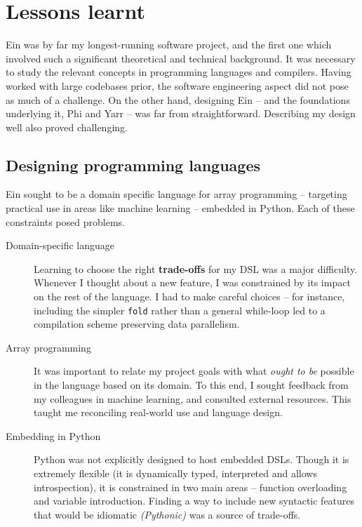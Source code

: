 \needspace{2em}
\section{Lessons learnt}

Ein was by far my longest-running software project, and the first one which involved such a significant theoretical and technical background. 
It was necessary to study the relevant concepts in programming languages and compilers.
Having worked with large codebases prior, the software engineering aspect did not pose as much of a challenge. 
On the other hand, designing Ein -- and the foundations underlying it, Phi and Yarr -- was far from straightforward. 
Describing my design well also proved challenging. 

\subsection{Designing programming languages}

Ein sought to be a domain specific language for array programming -- targeting practical use in areas like machine learning -- embedded in Python. Each of these constraints posed problems.

\begin{description}
    \item[Domain-specific language] 
    Learning to choose the right \textbf{trade-offs} for my DSL was a major difficulty. 
    Whenever I thought about a new feature, I was constrained by its impact on the rest of the language. 
    I had to make careful choices -- for instance, including the simpler \texttt{fold} rather than a general while-loop led to a compilation scheme preserving data parallelism.
    \item[Array programming] 
    It was important to relate my project goals with what \textit{ought to be} possible in the language based on its domain. 
    To this end, I sought feedback from my colleagues in machine learning, and consulted external resources.
    This taught me reconciling real-world use and language design.
    \item[Embedding in Python] 
    Python was not explicitly designed to host embedded DSLs. 
    Though it is extremely flexible (it is dynamically typed, interpreted and allows introspection), it is constrained in two main areas -- function overloading and variable introduction. 
    Finding a way to include new syntactic features that would be idiomatic \textit{(Pythonic)} was a source of trade-offs.
\end{description}

